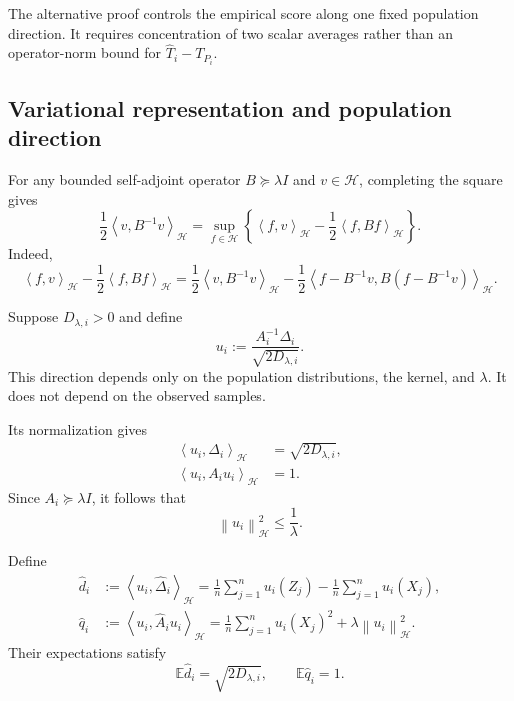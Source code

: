 \documentclass[11pt]{article}
\newcommand{\HH}{\mathcal H}
\newcommand{\E}{\mathbb E}
\newcommand{\inner}[2]{\left\langle #1,#2\right\rangle_{\HH}}
\newcommand{\norm}[1]{\left\lVert #1\right\rVert_{\HH}}
\begin{document}
The alternative proof controls the empirical score along
one fixed population direction. It requires concentration
of two scalar averages rather than an operator-norm bound
for $\widehat T_i-T_{P_i}$.

\subsection{Variational representation and population direction}

For any bounded self-adjoint operator $B\succeq\lambda I$
and $v\in\HH$, completing the square gives
\begin{equation}
    \frac12\inner{v}{B^{-1}v}
    =
    \sup_{f\in\HH}
    \left\{
        \inner{f}{v}-\frac12\inner{f}{Bf}
    \right\}.
    \label{eq:variational}
\end{equation}
Indeed,
\[
    \inner{f}{v}-\frac12\inner{f}{Bf}
    =
    \frac12\inner{v}{B^{-1}v}
    -
    \frac12
    \inner{f-B^{-1}v}{B(f-B^{-1}v)}.
\]

Suppose $D_{\lambda,i}>0$ and define
\begin{equation}
    u_i
    :=
    \frac{A_i^{-1}\Delta_i}{\sqrt{2D_{\lambda,i}}}.
    \label{eq:direction}
\end{equation}
This direction depends only on the population distributions,
the kernel, and $\lambda$. It does not depend on the
observed samples.

Its normalization gives
\begin{align}
    \inner{u_i}{\Delta_i}
    &=\sqrt{2D_{\lambda,i}},
    \label{eq:direction-signal}\\
    \inner{u_i}{A_i u_i}
    &=1.
    \label{eq:direction-energy}
\end{align}
Since $A_i\succeq\lambda I$, it follows that
\begin{equation}
    \norm{u_i}^2\le\frac1\lambda.
    \label{eq:direction-norm}
\end{equation}

Define
\begin{align}
    \widehat d_i
    &:=
    \inner{u_i}{\widehat\Delta_i}
    =
    \frac1n\sum_{j=1}^n u_i(Z_j)
    -
    \frac1n\sum_{j=1}^n u_i(X_j),
    \label{eq:empirical-signal}\\
    \widehat q_i
    &:=
    \inner{u_i}{\widehat A_i u_i}
    =
    \frac1n\sum_{j=1}^n u_i(X_j)^2
    +\lambda\norm{u_i}^2.
    \label{eq:empirical-energy}
\end{align}
Their expectations satisfy
\[
    \E\widehat d_i=\sqrt{2D_{\lambda,i}},
    \qquad
    \E\widehat q_i=1.
\]
\end{document}
